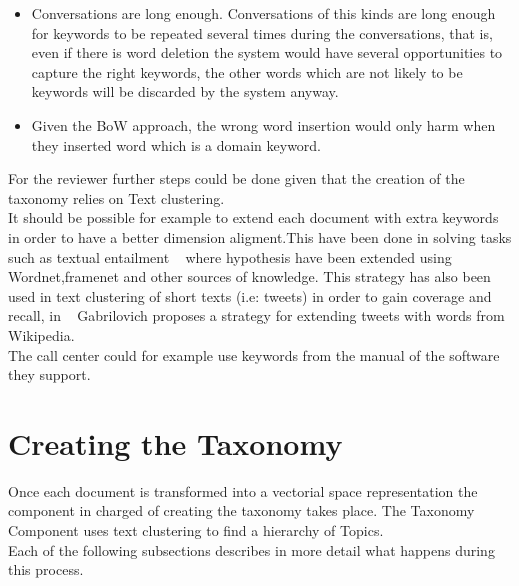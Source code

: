 \documentclass[4pt,a4paper,twocolumn]{article}
\begin{document}
\begin{itemize}
	\item Conversations are long enough. Conversations of this kinds are long enough for keywords to be repeated several times during the conversations, that is, even if there is word deletion the system would have several opportunities to capture the right keywords, the other words which are not likely to be keywords will be discarded by the system anyway.

  \item Given the BoW approach, the wrong word insertion would only harm when they inserted word which is a domain keyword.
  
\end{itemize}

For the reviewer further steps could be done given that the creation of the taxonomy relies on Text clustering.\\
It should be possible for example to extend each document with extra keywords in order to have a better dimension aligment.This have been done in solving tasks such as  textual entailment ~\cite{Mirkin:2009:EIU:1609067.1609129} where hypothesis have been extended using Wordnet,framenet and other sources of knowledge. This strategy has also been used in text clustering of short texts (i.e: tweets)  in order to gain coverage and recall, in ~\cite{Gabrilovich:2006:OBB:1597348.1597395} Gabrilovich proposes a strategy for extending tweets with words from Wikipedia.\\
The call center could for example use keywords from the manual of the software they support.


\section{Creating the Taxonomy}

Once each document is transformed into a vectorial space representation the component in charged of creating the taxonomy takes place. The Taxonomy Component uses text clustering to find a hierarchy of Topics.\\
Each of the following subsections describes in more detail what happens during this process.
\end{document}
